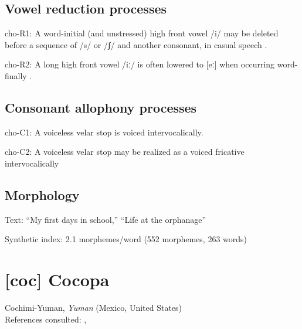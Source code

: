 {\subsection*{Vowel reduction processes}
\begin{appendixdesc}

\item[cho-R1:] A word-initial (and unstressed) high front vowel /i/ may be deleted before a sequence of /s/ or /ʃ/ and another consonant, in casual speech \citep[19]{Broadwell2006}.

\item[cho-R2:] A long high front vowel /iː/ is often lowered to [eː] when occurring word-finally \citep[30]{Broadwell2006}.
\end{appendixdesc}
\subsection*{Consonant allophony processes}
\begin{appendixdesc}

\item[cho-C1:] A voiceless velar stop is voiced intervocalically. \citep[15]{Broadwell2006}

\item[cho-C2:]  A voiceless velar stop may be realized as a voiced fricative intervocalically \citep[15]{Broadwell2006}
\end{appendixdesc}
\subsection*{Morphology}

\begin{appendixdesc}

\item[Text:] “My first days in school,” “Life at the orphanage” \citep[355--360]{Broadwell2006}

\item[Synthetic index:] 2.1 morphemes/word (552 morphemes, 263 words)
\end{appendixdesc}
\newpage\section*{[coc] Cocopa}  %
Cochimi-Yuman, \textit{Yuman} (Mexico, United States)\medskip\\
References consulted: \citet{Bendixen1980}, \citet{Crawford1966}

}
